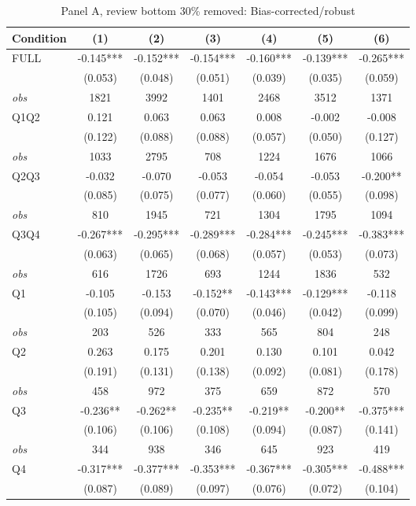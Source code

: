 \begin{table}[!htbp]
\centering
\caption{Panel A, review bottom 30\% removed: Bias-corrected/robust}
\begin{tabular}{lcccccc}
\toprule
Condition & (1) & (2) & (3) & (4) & (5) & (6) \\
\midrule
FULL & -0.145*** & -0.152*** & -0.154*** & -0.160*** & -0.139*** & -0.265*** \\
 & (0.053) & (0.048) & (0.051) & (0.039) & (0.035) & (0.059) \\
\textit{obs} & 1821 & 3992 & 1401 & 2468 & 3512 & 1371 \\
Q1Q2 & 0.121 & 0.063 & 0.063 & 0.008 & -0.002 & -0.008 \\
 & (0.122) & (0.088) & (0.088) & (0.057) & (0.050) & (0.127) \\
\textit{obs} & 1033 & 2795 & 708 & 1224 & 1676 & 1066 \\
Q2Q3 & -0.032 & -0.070 & -0.053 & -0.054 & -0.053 & -0.200** \\
 & (0.085) & (0.075) & (0.077) & (0.060) & (0.055) & (0.098) \\
\textit{obs} & 810 & 1945 & 721 & 1304 & 1795 & 1094 \\
Q3Q4 & -0.267*** & -0.295*** & -0.289*** & -0.284*** & -0.245*** & -0.383*** \\
 & (0.063) & (0.065) & (0.068) & (0.057) & (0.053) & (0.073) \\
\textit{obs} & 616 & 1726 & 693 & 1244 & 1836 & 532 \\
Q1 & -0.105 & -0.153 & -0.152** & -0.143*** & -0.129*** & -0.118 \\
 & (0.105) & (0.094) & (0.070) & (0.046) & (0.042) & (0.099) \\
\textit{obs} & 203 & 526 & 333 & 565 & 804 & 248 \\
Q2 & 0.263 & 0.175 & 0.201 & 0.130 & 0.101 & 0.042 \\
 & (0.191) & (0.131) & (0.138) & (0.092) & (0.081) & (0.178) \\
\textit{obs} & 458 & 972 & 375 & 659 & 872 & 570 \\
Q3 & -0.236** & -0.262** & -0.235** & -0.219** & -0.200** & -0.375*** \\
 & (0.106) & (0.106) & (0.108) & (0.094) & (0.087) & (0.141) \\
\textit{obs} & 344 & 938 & 346 & 645 & 923 & 419 \\
Q4 & -0.317*** & -0.377*** & -0.353*** & -0.367*** & -0.305*** & -0.488*** \\
 & (0.087) & (0.089) & (0.097) & (0.076) & (0.072) & (0.104) \\

\end{tabular}
\end{table}
